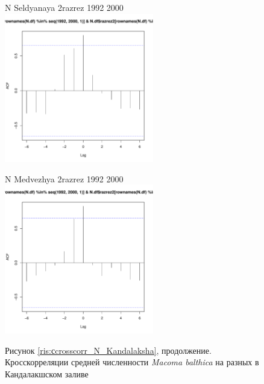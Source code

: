\documentclass[12pt, a4paper]{disser}
\begin{document}
\begin{figure}[ht]
	\begin{minipage}[b]{.46\linewidth}
	\begin{center}
	{\tiny  N Seldyanaya 2razrez 1992 2000}
	\includegraphics[width=65mm]{../White_Sea/dynamic_N_N1/crosscorr_N_Seldyanaya_2razrez_1992_2000.pdf}
	\end{center}
	\end{minipage}
%
	\hfil %
%
	\begin{minipage}[b]{.46\linewidth}
	\begin{center}
	{\tiny   N Medvezhya 2razrez 1992 2000}
	\includegraphics[width=65mm]{../White_Sea/dynamic_N_N1/crosscorr_N_Medvezhya_2razrez_1992_2000.pdf}
	\end{center}
	\end{minipage}

\begin{center}
Рисунок \ref{ris:сcrosscorr_N_Kandalaksha}, продолжение. Кросскорреляции средней численности {\it Macoma balthica} на разных в Кандалакшском заливе
\end{center}
	\end{figure}
\end{document}
